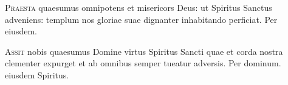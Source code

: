 \lettrine{P}{raesta} quaesumus omnipotens et misericors Deus:
ut Spiritus Sanctus adveniens:
templum nos gloriae suae dignanter inhabitando perficiat.
Per eiusdem.


\lettrine{A}{ssit} nobis quaesumus Domine virtus Spiritus Sancti
quae et corda nostra clementer expurget
et ab omnibus semper tueatur adversis.
Per dominum.  eiusdem Spiritus.


\headingCantus





